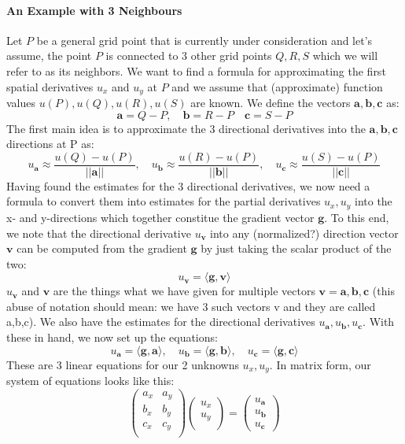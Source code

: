 \paragraph{An Example with 3 Neighbours}
Let $P$ be a general grid point that is currently under consideration and let's assume, the point $P$ is connected to 3 other grid points $Q,R,S$ which we will refer to as its neighbors. We want to find a formula for approximating the first spatial derivatives $u_x$ and $u_y$ at $P$ and we assume that (approximate) function values $u(P),u(Q),u(R),u(S)$ are known. We define the vectors $\mathbf{a,b,c}$ as:
\begin{equation}
\mathbf{a} = Q-P, \quad \mathbf{b} = R-P \quad \mathbf{c} = S-P 
\end{equation}
The first main idea is to approximate the 3 directional derivatives into the $\mathbf{a,b,c}$ directions at P as:
\begin{equation}
 u_{\mathbf{a}} \approx \frac{u(Q)-u(P)}{||\mathbf{a}||}, \quad
 u_{\mathbf{b}} \approx \frac{u(R)-u(P)}{||\mathbf{b}||}, \quad
 u_{\mathbf{c}} \approx \frac{u(S)-u(P)}{||\mathbf{c}||}
\end{equation}
Having found the estimates for the 3 directional derivatives, we now need a formula to convert them into estimates for the partial derivatives $u_x,u_y$ into the x- and y-directions which together constitue 
the gradient vector $\mathbf{g}$. To this end, we note that the directional derivative $u_\mathbf{v}$ into any (normalized?) direction vector $\mathbf{v}$ can be computed from the gradient $\mathbf{g}$ by just taking the scalar product of the two: 
\begin{equation}
u_\mathbf{v} = \langle \mathbf{g,v} \rangle
\end{equation}
$u_\mathbf{v}$ and $\mathbf{v}$ are the things what we have given for multiple vectors $\mathbf{v = a,b,c}$ (this abuse of notation should mean: we have 3 such vectors v and they are called a,b,c). We also have the
estimates for the directional derivatives $u_\mathbf{a},u_\mathbf{b},u_\mathbf{c}$. With these in hand, we now set up the equations:
\begin{equation}
u_\mathbf{a} = \langle \mathbf{g,a} \rangle, \quad
u_\mathbf{b} = \langle \mathbf{g,b} \rangle, \quad
u_\mathbf{c} = \langle \mathbf{g,c} \rangle
\end{equation}
These are 3 linear equations for our 2 unknowns $u_x,u_y$. In matrix form, our system of equations looks like this:
\begin{equation}
\begin{pmatrix}
  a_x & a_y  \\
  b_x & b_y  \\
  c_x & c_y  \\
\end{pmatrix}
\begin{pmatrix}
  u_x  \\
  u_y  \\
\end{pmatrix}
=
\begin{pmatrix}
  u_{\mathbf{a}}  \\
  u_{\mathbf{b}}  \\
  u_{\mathbf{c}}
\end{pmatrix}
\end{equation}
